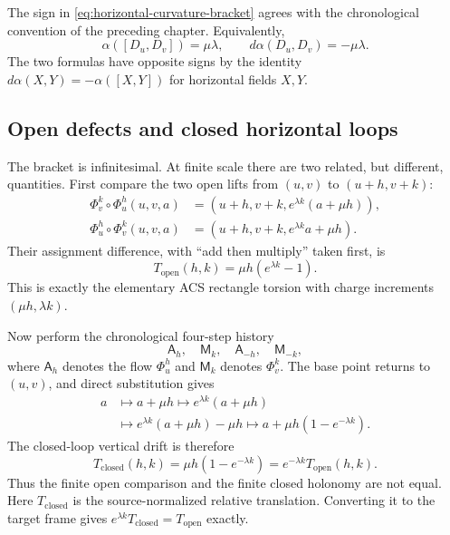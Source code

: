 The sign in \eqref{eq:horizontal-curvature-bracket} agrees with the
chronological convention of the preceding chapter.  Equivalently,
\[
    \alpha([D_u,D_v])=\mu\lambda,
    \qquad
    d\alpha(D_u,D_v)=-\mu\lambda.
\]
The two formulas have opposite signs by the identity
\(d\alpha(X,Y)=-\alpha([X,Y])\) for horizontal fields \(X,Y\).

\subsection{Open defects and closed horizontal loops}

The bracket is infinitesimal.  At finite scale there are two related, but
different, quantities.  First compare the two open lifts from \((u,v)\) to
\((u+h,v+k)\):
\begin{align*}
    \Phi_v^k\circ\Phi_u^h(u,v,a)
      &=(u+h,v+k,e^{\lambda k}(a+\mu h)),\\
    \Phi_u^h\circ\Phi_v^k(u,v,a)
      &=(u+h,v+k,e^{\lambda k}a+\mu h).
\end{align*}
Their assignment difference, with ``add then multiply'' taken first, is
\begin{equation}
    T_{\mathrm{open}}(h,k)
      =\mu h(e^{\lambda k}-1).
    \label{eq:exact-open-contact-defect}
\end{equation}
This is exactly the elementary ACS rectangle torsion with charge increments
\((\mu h,\lambda k)\).

Now perform the chronological four-step history
\[
    \mathsf A_h,\quad \mathsf M_k,\quad
    \mathsf A_{-h},\quad \mathsf M_{-k},
\]
where \(\mathsf A_h\) denotes the flow \(\Phi_u^h\) and
\(\mathsf M_k\) denotes \(\Phi_v^k\).  The base point returns to \((u,v)\),
and direct substitution gives
\begin{align*}
    a&\longmapsto a+\mu h
      \longmapsto e^{\lambda k}(a+\mu h)\\
     &\longmapsto e^{\lambda k}(a+\mu h)-\mu h
      \longmapsto a+\mu h(1-e^{-\lambda k}).
\end{align*}
The closed-loop vertical drift is therefore
\begin{equation}
    T_{\mathrm{closed}}(h,k)
       =\mu h(1-e^{-\lambda k})
       =e^{-\lambda k}T_{\mathrm{open}}(h,k).
    \label{eq:exact-closed-contact-drift}
\end{equation}
Thus the finite open comparison and the finite closed holonomy are not equal.
Here \(T_{\mathrm{closed}}\) is the source-normalized relative translation.
Converting it to the target frame gives
\(e^{\lambda k}T_{\mathrm{closed}}=T_{\mathrm{open}}\) exactly.

